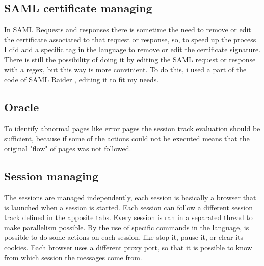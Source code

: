 \subsection{SAML certificate managing}
In SAML Requests and responses there is sometime the need to remove or edit the certificate associated to that request or response, so, to speed up the process I did add a specific tag in the language to remove or edit the certificate signature. There is still the possibility of doing it by editing the SAML request or response with a regex, but this way is more convinient.
To do this, i used a part of the code of SAML Raider \cite{saml_raider}, editing it to fit my needs.

\subsection{Oracle}

To identify abnormal pages like error pages the \gls{session track} evaluation should be sufficient, because if some of the actions could not be executed means that the original "flow" of pages was not followed.

\subsection{Session managing}
The sessions are managed independently, each session is basically a browser that is launched when a session is started. Each session can follow a different \gls{session track} defined in the apposite tabs. Every session is ran in a separated thread to make parallelism possible. By the use of specific commands in the language, is possible to do some actions on each session, like stop it, pause it, or clear its cookies. Each browser uses a different proxy port, so that it is possible to know from which session the messages come from.




